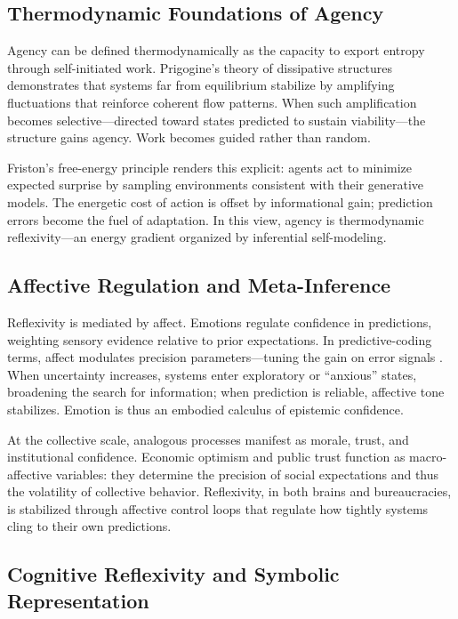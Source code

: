 \documentclass[11pt,a4paper]{article}
\begin{document}
\subsection{Thermodynamic Foundations of Agency}

Agency can be defined thermodynamically as the capacity to export entropy through self-initiated work.  Prigogine’s theory of dissipative structures \citep{Prigogine1977SelfOrganizationNonequilibrium} demonstrates that systems far from equilibrium stabilize by amplifying fluctuations that reinforce coherent flow patterns.  When such amplification becomes selective—directed toward states predicted to sustain viability—the structure gains agency.  Work becomes guided rather than random.

Friston’s free-energy principle renders this explicit: agents act to minimize expected surprise by sampling environments consistent with their generative models.  The energetic cost of action is offset by informational gain; prediction errors become the fuel of adaptation.  In this view, agency is thermodynamic reflexivity—an energy gradient organized by inferential self-modeling.

\subsection{Affective Regulation and Meta-Inference}

Reflexivity is mediated by affect.  Emotions regulate confidence in predictions, weighting sensory evidence relative to prior expectations.  In predictive-coding terms, affect modulates precision parameters—tuning the gain on error signals \citep{Vasileiou2023ArousalCoherence, Smith2023FeelingOurPlace}.  When uncertainty increases, systems enter exploratory or “anxious” states, broadening the search for information; when prediction is reliable, affective tone stabilizes.  Emotion is thus an embodied calculus of epistemic confidence.

At the collective scale, analogous processes manifest as morale, trust, and institutional confidence.  Economic optimism and public trust function as macro-affective variables: they determine the precision of social expectations and thus the volatility of collective behavior.  Reflexivity, in both brains and bureaucracies, is stabilized through affective control loops that regulate how tightly systems cling to their own predictions.

\subsection{Cognitive Reflexivity and Symbolic Representation}
\end{document}

